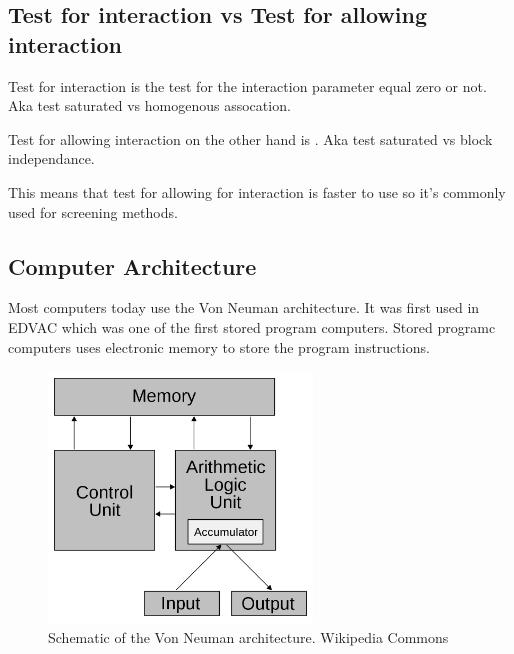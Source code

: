 \documentclass[10pt,a4paper]{article}
\begin{document}

\subsection{Test for interaction vs Test for allowing interaction}
\label{test_type}
Test for interaction is the test for the interaction parameter equal zero or not. Aka test saturated vs homogenous assocation\cite{boost_gene_gene}.

Test for allowing interaction on the other hand is . Aka test saturated vs block independance\cite{boost_gene_gene}.

This means that test for allowing for interaction is faster to use so it's commonly used for screening methods.

\cite{cordell_detect_review}
\clearpage
\subsection{Computer Architecture}
Most computers today use the Von Neuman architecture\cite{}. It was first used in EDVAC which was one of the first stored program computers\cite{von1993first}. Stored programc computers uses electronic memory to store the program instructions\cite{computer_arch_2003}.

\begin{figure}[h]
    \centering
    \includegraphics[width=7cm]{Von_Neumann_architecture.png}
    \caption{Schematic of the Von Neuman architecture. Wikipedia Commons}
    \label{fig:VonNeuman}
\end{figure}
\end{document}
